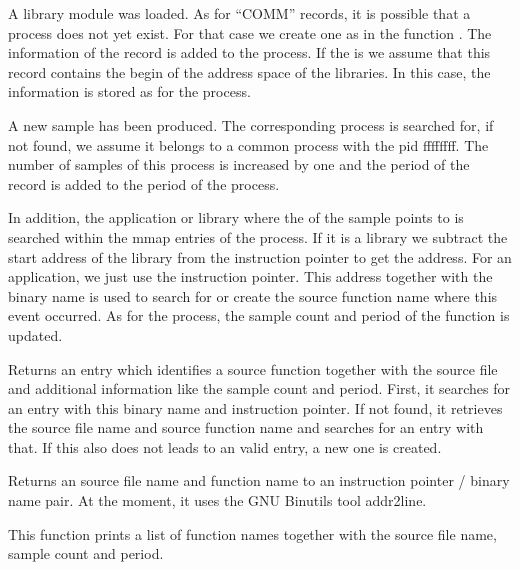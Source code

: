A library module was loaded. As for ``COMM'' records, it is possible that a process does not yet exist. For that case we create one as in the function .
The information of the record is added to the process. If the  is \code{[vdso]} we assume that this record contains the begin of the address space of the libraries. In this case, the  information is stored as  for the process.

A new sample has been produced. The corresponding process is searched for, if not found, we assume it belongs to a common process with the pid ffffffff. The number of samples of this process is increased by one and the period of the record is added to the period of the process.

In addition, the application or library where the  of the sample points to is searched within the mmap entries of the process. If it is a library we subtract the start address of the library from the instruction pointer to get the address. For an application, we just use the instruction pointer. This address together with the binary name is used to search for or create the source function name where this event occurred.
As for the process, the sample count and period of the function is updated.

Returns an entry which identifies a source function together with the source file and additional information like the sample count and period. First, it searches for an entry with this binary name and instruction pointer. If not found, it retrieves the source file name and source function name and searches for an entry with that. If this also does not leads to an valid entry, a new one is created.

Returns an source file name and function name to an instruction pointer / binary name pair. At the moment, it uses the GNU Binutils tool addr2line.

This function prints a list of function names together with the source file name, sample count and period.
